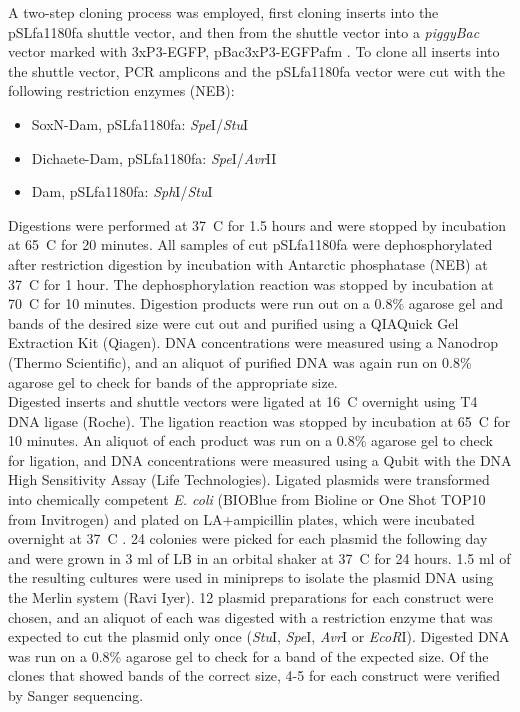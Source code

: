 A two-step cloning process was employed, first cloning inserts into the pSLfa1180fa shuttle vector, and then from the shuttle vector into a \emph{piggyBac} vector marked with 3xP3-EGFP, pBac{3xP3-EGFPafm} \citep{horn_versatile_2000}. To clone all inserts into the shuttle vector, PCR amplicons and the pSLfa1180fa vector were cut with the following restriction enzymes (NEB):
\begin{itemize}
	\item SoxN-Dam, pSLfa1180fa: \emph{Spe}I/\emph{Stu}I
	\item Dichaete-Dam, pSLfa1180fa: \emph{Spe}I/\emph{Avr}II
	\item Dam, pSLfa1180fa: \emph{Sph}I/\emph{Stu}I
\end{itemize}
Digestions were performed at 37\degree~C for 1.5 hours and were stopped by incubation at 65\degree~C for 20 minutes. All samples of cut pSLfa1180fa were dephosphorylated after restriction digestion by incubation with Antarctic phosphatase (NEB) at 37\degree~C for 1 hour. The dephosphorylation reaction was stopped by incubation at 70\degree~C for 10 minutes. Digestion products were run out on a 0.8\% agarose gel and bands of the desired size were cut out and purified using a QIAQuick Gel Extraction Kit (Qiagen). DNA concentrations were measured using a Nanodrop (Thermo Scientific), and an aliquot of purified DNA was again run on 0.8\% agarose gel to check for bands of the appropriate size.\\
  
Digested inserts and shuttle vectors were ligated at 16\degree~C overnight using T4 DNA ligase (Roche). The ligation reaction was stopped by incubation at 65\degree~C for 10 minutes. An aliquot of each product was run on a 0.8\% agarose gel to check for ligation, and DNA concentrations were measured using a Qubit with the DNA High Sensitivity Assay (Life Technologies). Ligated plasmids were transformed into chemically competent \emph{E. coli} (BIOBlue from Bioline or One Shot TOP10 from Invitrogen) and plated on LA+ampicillin plates, which were incubated overnight at 37\degree~C . 24 colonies were picked for each plasmid the following day and were grown in 3 ml of LB in an orbital shaker at 37\degree~C for 24 hours. 1.5 ml of the resulting cultures were used in minipreps to isolate the plasmid DNA using the Merlin system (Ravi Iyer). 12 plasmid preparations for each construct were chosen, and an aliquot of each was digested with a restriction enzyme that was expected to cut the plasmid only once (\emph{Stu}I, \emph{Spe}I, \emph{Avr}I or \emph{EcoR}I). Digested DNA was run on a 0.8\% agarose gel to check for a band of the expected size. Of the clones that showed bands of the correct size, 4-5 for each construct were verified by Sanger sequencing.\\

